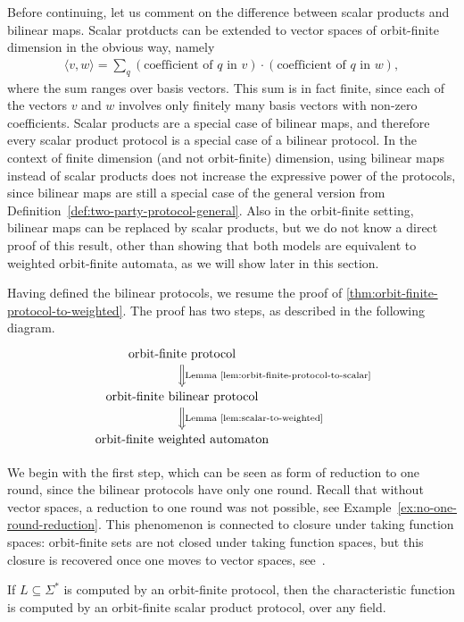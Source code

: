 \begin{theorem}
Before continuing, let us comment on the difference between scalar products and bilinear maps. Scalar protducts can be extended to vector spaces of orbit-finite dimension in the obvious way, namely
\begin{align*}
\langle v, w \rangle = \sum_{q} (\text{coefficient of $q$ in $v$}) \cdot ( \text{coefficient of $q$ in $w$}),
\end{align*}
where the sum ranges over basis vectors. This sum is in fact finite, since each of the vectors $v$ and $w$ involves only finitely many basis vectors with non-zero coefficients.
Scalar products are a special case of bilinear maps, and therefore every scalar product protocol is a special case of a bilinear protocol. In the context of finite dimension (and not orbit-finite) dimension, using bilinear maps instead of scalar products does not increase the expressive power of the protocols, since bilinear maps are still a special case of the general version from Definition~\ref{def:two-party-protocol-general}. Also in the orbit-finite setting, bilinear maps can be replaced by scalar products, but we do not know a direct proof of this result, other than showing that both models are equivalent to weighted orbit-finite automata, as we will show later in this section. 

Having defined the bilinear protocols, we resume the proof of \cref{thm:orbit-finite-protocol-to-weighted}. The proof has two steps, as described in the following diagram.
\[
\begin{tikzcd}
\text{orbit-finite protocol}
\ar[d,Rightarrow,"\text{Lemma~\ref{lem:orbit-finite-protocol-to-scalar}}"]
\\
\text{orbit-finite bilinear protocol}
\ar[d,Rightarrow, "\text{Lemma~\ref{lem:scalar-to-weighted}}"]
\\
\text{orbit-finite weighted automaton}
\end{tikzcd}
\]

We begin with the first step, which can be seen as form of reduction to one round, since the bilinear protocols have only one round. Recall that without vector spaces, a reduction to one round was not possible, see Example~\ref{ex:no-one-round-reduction}. This phenomenon is connected to closure under taking function spaces: orbit-finite sets are not closed under taking function spaces, but this closure is recovered once one moves to vector spaces, see~\cite[Section 8.3]{bojanczyk_slightly}. 

\begin{lemma}\label{lem:orbit-finite-protocol-to-scalar}
    If $L \subseteq \Sigma^*$ is computed by an orbit-finite protocol, then the characteristic function is computed by an orbit-finite scalar product protocol, over any field.
\end{lemma}



\end{theorem}
